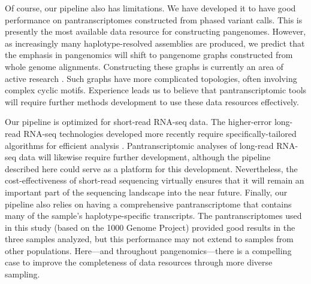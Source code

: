 \documentclass[11pt]{ucthesis}
\begin{document}
Of course, our pipeline also has limitations. We have developed it to have good performance on pantranscriptomes constructed from phased variant calls. This is presently the most available data resource for constructing pangenomes. However, as increasingly many haplotype-resolved assemblies are produced, we predict that the emphasis in pangenomics will shift to pangenome graphs constructed from whole genome alignments. Constructing these graphs is currently an area of active research \cite{li2020design,jandrasits2018seq}. Such graphs have more complicated topologies, often involving complex cyclic motifs. Experience leads us to believe that pantranscriptomic tools will require further methods development to use these data resources effectively.

Our pipeline is optimized for short-read RNA-seq data. The higher-error long-read RNA-seq technologies developed more recently require specifically-tailored algorithms for efficient analysis \cite{li2018minimap2,wyman2019technology}. Pantranscriptomic analyses of long-read RNA-seq data will likewise require further development, although the pipeline described here could serve as a platform for this development. Nevertheless, the cost-effectiveness of short-read sequencing virtually ensures that it will remain an important part of the sequencing landscape into the near future.
Finally, our pipeline also relies on having a comprehensive pantranscriptome that contains many of the sample's haplotype-specific transcripts. The pantranscriptomes used in this study (based on the 1000 Genome Project) provided good results in the three samples analyzed, but this performance may not extend to samples from other populations. Here---and throughout pangenomics---there is a compelling case to improve the completeness of data resources through more diverse sampling.
\end{document}
